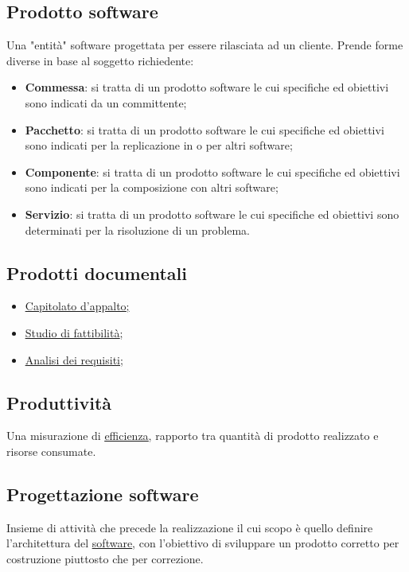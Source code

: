 	\subsection{Prodotto software}
	\label{sec:prodottosoftware}
	Una "entità" software progettata per essere rilasciata ad un cliente.
	Prende forme diverse in base al soggetto richiedente:
	\begin{itemize}
		\item\textbf{Commessa}: si tratta di un prodotto software le cui specifiche ed obiettivi sono indicati da un committente;
		\item\textbf{Pacchetto}: si tratta di un prodotto software le cui specifiche ed obiettivi sono indicati per la replicazione in o per altri software;
		\item\textbf{Componente}: si tratta di un prodotto software le cui specifiche ed obiettivi sono indicati per la composizione con altri software;
		\item\textbf {Servizio}: si tratta di un prodotto software le cui specifiche ed obiettivi sono determinati per la risoluzione di un problema.
	\end{itemize}		


	\subsection{Prodotti documentali}
	\label{sec:prodottidocumentali}
	\begin{itemize}
	\item \underline{\hyperref[sec:capitolato]{Capitolato d'appalto};}
	\item \underline{\hyperref[sec:studiofattibilita]{Studio di fattibilità}};
	\item \underline{\hyperref[sec:analisirequisiti]{Analisi dei requisiti}};
	\end{itemize}


	\subsection{Produttività}
	\label{sec:produttivita}
	Una misurazione di \underline{\hyperref[sec:efficienza]{efficienza}}, rapporto tra quantità di prodotto realizzato e risorse consumate.


	\subsection{Progettazione software}
	\label{sec:progettazionesoftware}
	Insieme di attività che precede la realizzazione il cui scopo è quello definire l'architettura del \underline{\hyperref[sec:prodottosoftware]{software}}, con l'obiettivo di sviluppare un prodotto corretto per costruzione piuttosto che per correzione.


